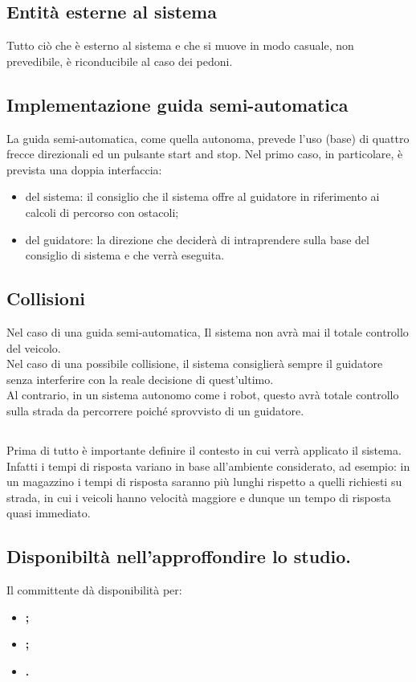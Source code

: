 \documentclass[]{article}
\begin{document}
		\subsection{Entità esterne al sistema}
		Tutto ciò che è esterno al sistema e che si muove in modo casuale, non prevedibile, è riconducibile al caso dei pedoni.
	
		\subsection{Implementazione guida semi-automatica}
		La guida semi-automatica, come quella autonoma, prevede l'uso (base) di quattro frecce direzionali ed un pulsante start and stop.
		Nel primo caso, in particolare, è prevista una doppia interfaccia:
		\begin{itemize}
			\item del sistema: il consiglio che il sistema offre al guidatore in riferimento ai calcoli di percorso con ostacoli; 
			\item del guidatore: la direzione che deciderà di intraprendere sulla base del consiglio di sistema e che verrà eseguita.
		\end{itemize}
	
	
		\subsection{Collisioni}
		Nel caso di una guida semi-automatica, Il sistema non avrà mai il totale controllo del veicolo.\\
		Nel caso di una possibile collisione, il sistema consiglierà sempre il guidatore senza interferire con la reale decisione di quest'ultimo. \\
		Al contrario, in un sistema autonomo come i robot, questo avrà totale controllo sulla strada da percorrere poiché sprovvisto di un guidatore.
	
		\subsection{}
		Prima di tutto è importante definire il contesto in cui verrà applicato il sistema.\\
		Infatti i tempi di risposta variano in base all'ambiente considerato, ad esempio: in un magazzino i tempi di risposta saranno più lunghi 
		rispetto a quelli richiesti su strada, in cui i veicoli hanno velocità maggiore e dunque un tempo di risposta quasi immediato.

		\subsection{Disponibiltà nell'approffondire lo studio.}
		Il committente dà disponibilità per:
		\begin{itemize}
			\item \bfseries{};
			\item \bfseries{};
			\item \bfseries{}.
		\end{itemize}
		
\end{document}
